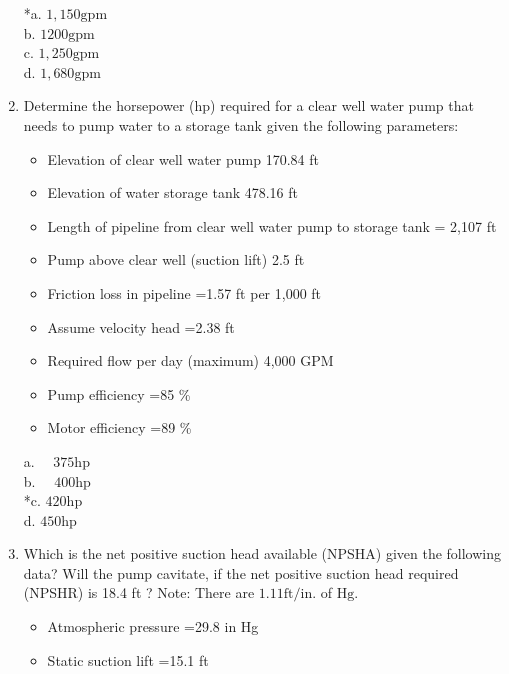 \begin{enumerate}
*a. $1,150 \mathrm{gpm}$\\
b. $1200 \mathrm{gpm}$\\
c. $1,250 \mathrm{gpm}$\\
d. $1,680 \mathrm{gpm}$\\
  \item Determine the horsepower (hp) required for a clear well water pump that needs to pump water to a storage tank given the following parameters:\\
\begin{itemize}
  \item Elevation of clear well water pump 170.84 ft\\
  \item Elevation of water storage tank 478.16 ft\\
  \item Length of pipeline from clear well water pump to storage tank = 2,107 ft\\
  \item Pump above clear well (suction lift) 2.5 ft\\
  \item Friction loss in pipeline =1.57 ft per 1,000 ft\\
  \item Assume velocity head =2.38 ft\\
  \item Required flow per day (maximum) 4,000 GPM\\
  \item Pump efficiency =85 \%\\
  \item Motor efficiency =89 \%\\
\end{itemize}
a. $\quad 375 \mathrm{hp}$\\
b. $\quad 400 \mathrm{hp}$\\
*c. $420 \mathrm{hp}$\\
d. $450 \mathrm{hp}$ \\
\item Which is the net positive suction head available (NPSHA) given the following data? Will the pump cavitate, if the net positive suction head required (NPSHR) is 18.4 ft ? Note: There are $1.11 \mathrm{ft} / \mathrm{in}$. of $\mathrm{Hg}$.\\
\begin{itemize}
  \item Atmospheric pressure =29.8 in Hg\\
  \item Static suction lift =15.1 ft\\

\end{itemize}
\end{enumerate}
